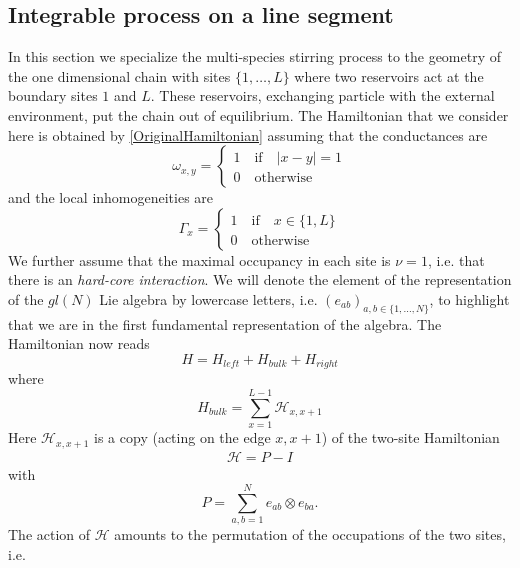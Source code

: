 \documentclass[10pt]{article}
\numberwithin{equation}{section}
\numberwithin{equation}{subsection}
\newcommand{\id}{I}
\begin{document}
\subsection{Integrable process on a line segment}\label{subsection-description-process-LINE}
In this section we specialize the multi-species stirring process to the geometry of the one dimensional chain with sites $\{1,\ldots,L\}$ where two reservoirs act at the boundary sites $1$ and $L$. These reservoirs, exchanging particle with the external environment, put the chain out of equilibrium. The Hamiltonian that we consider here is obtained by \eqref{OriginalHamiltonian} assuming that the conductances are
\begin{equation}
	\omega_{x,y}=\begin{cases}
		1 \quad \text{if}\quad |x-y|=1\\
		0\quad \text{otherwise}
	\end{cases}
\end{equation}
and the local inhomogeneities are
\begin{equation}
	\Gamma_{x}=\begin{cases}
		1\quad \text{if} \quad x\in \{1,L\}\\
		0\quad \text{otherwise}
	\end{cases}
\end{equation}
We further assume that the maximal occupancy in each site is $\nu=1$, i.e. that there is an \textit{hard-core interaction}.
We will denote the element of the representation of the $gl(N)$ Lie algebra by lowercase letters, i.e. $(e_{ab})_{a,b\in\{1,\ldots,N\}}$, to highlight that we are in the first fundamental representation of the algebra.
The Hamiltonian now reads
\begin{equation}\label{hamiltonian}
	H=H_{left}+H_{bulk}+H_{right}
\end{equation}
where
\begin{equation}
	H_{bulk}=\sum_{x=1}^{L-1}\mathcal{H}_{x,x+1}
\end{equation}
Here $\mathcal{H}_{x,x+1}$  is a copy (acting on the edge $x,x+1$) of the two-site Hamiltonian
\begin{equation}\label{H-corsivo}
	\begin{split}
		\mathcal{H}=P-\id
	\end{split}
\end{equation}
with 
\begin{equation}
	P=\sum_{a,b=1}^Ne_{ab}\otimes e_{ba}.
\end{equation} 
The action of $\mathcal{H}$ amounts to the permutation of the occupations of the two sites, i.e.
\end{document}
